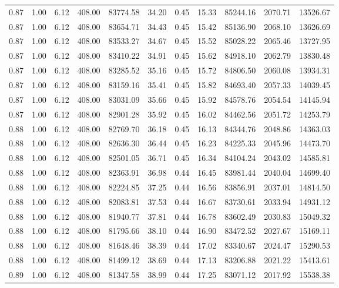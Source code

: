 \begin{table}[!ht]
\begin{tabular}{rrrrrrrrrrr}
0.87 & 1.00 & 6.12 & 408.00 & 83774.58 & 34.20 & 0.45 & 15.33 & 85244.16 & 2070.71 & 13526.67 \\
0.87 & 1.00 & 6.12 & 408.00 & 83654.71 & 34.43 & 0.45 & 15.42 & 85136.90 & 2068.10 & 13626.69 \\
0.87 & 1.00 & 6.12 & 408.00 & 83533.27 & 34.67 & 0.45 & 15.52 & 85028.22 & 2065.46 & 13727.95 \\
0.87 & 1.00 & 6.12 & 408.00 & 83410.22 & 34.91 & 0.45 & 15.62 & 84918.10 & 2062.79 & 13830.48 \\
0.87 & 1.00 & 6.12 & 408.00 & 83285.52 & 35.16 & 0.45 & 15.72 & 84806.50 & 2060.08 & 13934.31 \\
0.87 & 1.00 & 6.12 & 408.00 & 83159.16 & 35.41 & 0.45 & 15.82 & 84693.40 & 2057.33 & 14039.45 \\
0.87 & 1.00 & 6.12 & 408.00 & 83031.09 & 35.66 & 0.45 & 15.92 & 84578.76 & 2054.54 & 14145.94 \\
0.87 & 1.00 & 6.12 & 408.00 & 82901.28 & 35.92 & 0.45 & 16.02 & 84462.56 & 2051.72 & 14253.79 \\
0.88 & 1.00 & 6.12 & 408.00 & 82769.70 & 36.18 & 0.45 & 16.13 & 84344.76 & 2048.86 & 14363.03 \\
0.88 & 1.00 & 6.12 & 408.00 & 82636.30 & 36.44 & 0.45 & 16.23 & 84225.33 & 2045.96 & 14473.70 \\
0.88 & 1.00 & 6.12 & 408.00 & 82501.05 & 36.71 & 0.45 & 16.34 & 84104.24 & 2043.02 & 14585.81 \\
0.88 & 1.00 & 6.12 & 408.00 & 82363.91 & 36.98 & 0.44 & 16.45 & 83981.44 & 2040.04 & 14699.40 \\
0.88 & 1.00 & 6.12 & 408.00 & 82224.85 & 37.25 & 0.44 & 16.56 & 83856.91 & 2037.01 & 14814.50 \\
0.88 & 1.00 & 6.12 & 408.00 & 82083.81 & 37.53 & 0.44 & 16.67 & 83730.61 & 2033.94 & 14931.12 \\
0.88 & 1.00 & 6.12 & 408.00 & 81940.77 & 37.81 & 0.44 & 16.78 & 83602.49 & 2030.83 & 15049.32 \\
0.88 & 1.00 & 6.12 & 408.00 & 81795.66 & 38.10 & 0.44 & 16.90 & 83472.52 & 2027.67 & 15169.11 \\
0.88 & 1.00 & 6.12 & 408.00 & 81648.46 & 38.39 & 0.44 & 17.02 & 83340.67 & 2024.47 & 15290.53 \\
0.88 & 1.00 & 6.12 & 408.00 & 81499.12 & 38.69 & 0.44 & 17.13 & 83206.88 & 2021.22 & 15413.61 \\
0.89 & 1.00 & 6.12 & 408.00 & 81347.58 & 38.99 & 0.44 & 17.25 & 83071.12 & 2017.92 & 15538.38 \\

\end{tabular}
\end{table}
